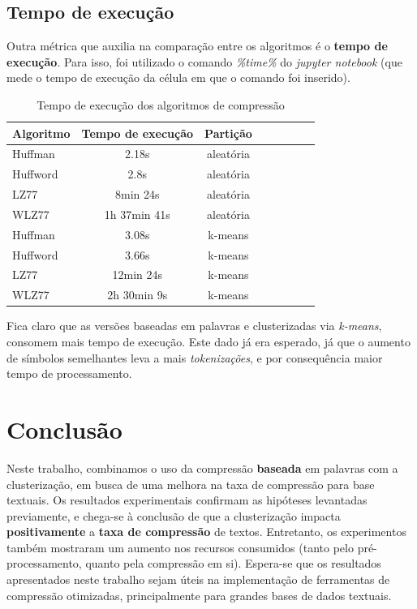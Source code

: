 \subsection{Tempo de execução}
Outra métrica que auxilia na comparação entre os algoritmos é o \textbf{tempo de execução}.
Para isso, foi utilizado o comando \emph{\%time\%} do \emph{jupyter notebook} (que mede o tempo de execução da célula em que o comando foi inserido).

\begin{table}[H]
   \centering
   \caption{Tempo de execução dos algoritmos de compressão} \label{tab:vcode}
   \begin{tabular}{|l|c|c|c|c|c|c|r|}
        \hline
        \small{Algoritmo} & \small{Tempo de execução} & \small{Partição} \\ \hline
              Huffman   &   2.18s                        & aleatória \\ \hline
              Huffword  &   2.8s                          & aleatória \\ \hline
              LZ77        &   8min 24s                  & aleatória \\ \hline
              WLZ77    &   1h 37min 41s           & aleatória \\ \hline
              Huffman  &   3.08s                       & k-means \\ \hline
              Huffword &   3.66s                       & k-means \\ \hline
              LZ77       &   12min 24s               & k-means \\ \hline
              WLZ77   &   2h 30min 9s            & k-means \\ \hline
  \end{tabular}
\end{table}

Fica claro que as versões baseadas em palavras e clusterizadas via \emph{k-means}, consomem mais tempo de execução.
Este dado já era esperado, já que o aumento de símbolos semelhantes leva a mais \emph{tokenizações}, e por consequência maior tempo de processamento.

\section{Conclusão}
Neste trabalho, combinamos o uso da compressão \textbf{baseada} em palavras com a clusterização, em busca de uma melhora na taxa de compressão para base textuais.
Os resultados experimentais confirmam as hipóteses levantadas previamente, 
e chega-se à conclusão de que a clusterização impacta \textbf{positivamente} a \textbf{taxa de compressão} de textos.
Entretanto, os experimentos também mostraram um aumento nos recursos consumidos (tanto pelo pré-processamento, quanto pela compressão em si).
Espera-se que os resultados apresentados neste trabalho sejam úteis na implementação de ferramentas de compressão otimizadas, principalmente para grandes bases de dados textuais.

